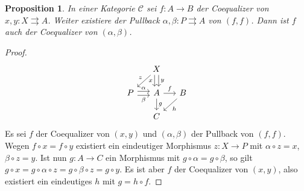 \documentclass[a4paper, parskip=half]{scrartcl}
\theoremstyle{marginbreak}
\newtheorem{proposition}[remark]{Proposition}
\theoremstyle{nonumberplain}
\newtheorem{proof}{Beweis.}
\newcommand\cat\mathcal
\newcommand{\n}{\pgfmatrixnextcell}
\begin{document}
		\begin{proposition}\label{2-5-7}
			In einer Kategorie $\cat{C}$ sei $f\colon A\to B$ der Coequalizer von
			$x, y\colon X\rightrightarrows A$. Weiter existiere der Pullback
			$\alpha, \beta\colon P\rightrightarrows A$ von $(f, f)$. Dann ist
			$f$ auch der Coequalizer von $(\alpha, \beta)$.
		\end{proposition}
		\begin{proof}
		\[
			\begin{tikzcd}[sep=1.4em]
				\n X \ar{dl}[']{z} \ar[shift left]{d}{y} \ar[shift right, ']{d}{x} \n \\
				P \ar[shift left]{r}{\alpha} \ar[shift right, ']{r}{\beta} \n \ar{d}{g} A \ar{r}{f} \n \ar{dl}{h} B \\
				\n C \n
			\end{tikzcd}
		\]
			Es sei $f$ der Coequalizer von $(x, y)$ und $(\alpha, \beta)$ der
			Pullback von $(f, f)$. Wegen $f\circ x = f\circ y$ existiert ein
			eindeutiger Morphismus $z\colon X \to P$ mit $\alpha\circ z = x$,
			$\beta\circ z=y$. Ist nun $g\colon A\to C$ ein Morphismus mit
			$g\circ\alpha = g\circ\beta$, so gilt $g\circ x = g\circ\alpha\circ z
			= g\circ\beta\circ z = g\circ y$. Es ist aber $f$ der Coequalizer von
			$(x, y)$, also existiert ein eindeutiges $h$ mit $g = h\circ f$.
		\end{proof}
\end{document}
